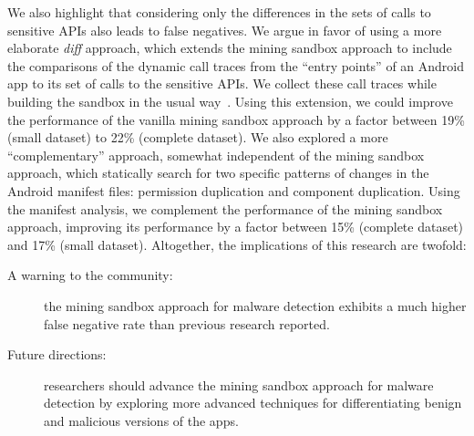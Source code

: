 We also highlight that considering only the differences in the
sets of calls to sensitive APIs also leads to false negatives. We
argue in favor of using a more elaborate \emph{diff} approach, which
extends the mining sandbox approach to include the comparisons of
the dynamic call traces from the ``entry points'' of an Android app to its
set of calls to the sensitive APIs. We collect these call traces while
building the sandbox in the usual way~\cite{DBLP:conf/icse/JamrozikSZ16}. Using this extension, we could improve
the performance of the vanilla mining sandbox approach by a factor
between 19\% (small dataset) to 22\% (complete dataset). We
also explored a more ``complementary'' approach, somewhat independent
of the mining sandbox approach, which statically search for two
specific patterns of changes in the Android manifest files: permission
duplication and component duplication. Using the manifest analysis,
we complement the performance of the mining sandbox approach, improving its performance by
a factor between 15\% (complete dataset) and 17\% (small dataset).
Altogether, the implications of this research are twofold:

\begin{description}
  \item[A warning to the community:] the mining sandbox approach for malware detection exhibits a much higher false negative rate  than previous research reported. 
  \item[Future directions:] researchers should advance the mining sandbox approach for malware detection by exploring more advanced techniques for differentiating benign and malicious versions of the apps. 
\end{description}  


